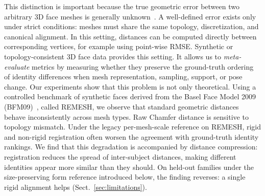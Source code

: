 \documentclass[10pt,twocolumn,letterpaper]{article}
\begin{document}
This distinction is important because the true geometric error between two arbitrary 3D face meshes is generally unknown~\cite{10448898}. A well-defined error exists only under strict conditions: meshes must share the same topology, discretization, and canonical alignment. In this setting, distances can be computed directly between corresponding vertices, for example using point-wise RMSE. Synthetic or topology-consistent 3D face data provides this setting. It allows us to \emph{meta-evaluate} metrics by measuring whether they preserve the ground-truth ordering of identity differences when mesh representation, sampling, support, or pose change. Our experiments show that this problem is not only theoretical. Using a controlled benchmark of synthetic faces derived from the Basel Face Model 2009 (BFM09)~\cite{paysan2009bfm}, called REMESH, we observe that standard geometric distances behave inconsistently across mesh types. Raw Chamfer distance is sensitive to topology mismatch. Under the legacy per-mesh-scale reference on REMESH, rigid and non-rigid registration often worsen the agreement with ground-truth identity rankings. We find that this degradation is accompanied by distance compression: registration reduces the spread of inter-subject distances, making different identities appear more similar than they should. On held-out families under the size-preserving form reference introduced below, the finding reverses: a single rigid alignment helps (Sect.~\ref{sec:limitations}).
\end{document}

